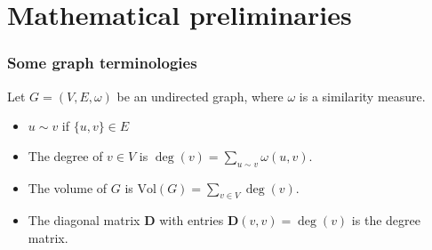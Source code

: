 \documentclass[professionalfonts,hyperref={colorlinks=true,linkcolor=red}]{beamer}
\begin{document}
\section{Mathematical preliminaries}
\begin{frame}[label=graph_terminology]
  \frametitle{Some graph terminologies}
  Let $G = (V,E,\omega)$ be an undirected graph, where
  $\omega$ is a similarity measure.
  \begin{itemize}
  \item $u \sim v$ if $\{u,v\} \in E$ 
  \item The degree of $v \in V$ is $\deg(v) = \sum_{u \sim
      v}{\omega(u,v)}$.
  \item The volume of $G$ is $\mathrm{Vol}(G) = \sum_{v \in
      V}{\deg(v)}$.
  \item The diagonal matrix $\bm{D}$ with entries $\bm{D}(v,v) =
    \deg(v)$ is the degree matrix. 
  \end{itemize}
\end{frame}
\end{document}
